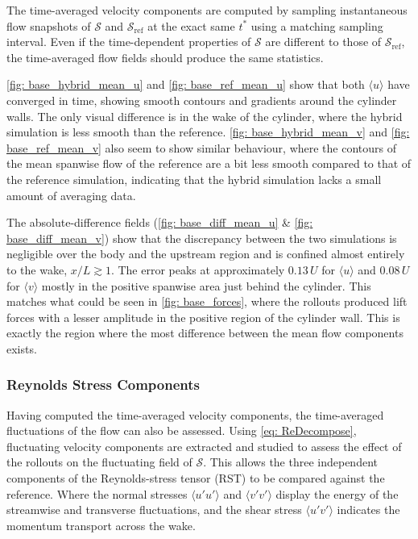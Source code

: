 The time-averaged velocity components are computed by sampling instantaneous flow snapshots of $\mathcal{S}$ and $\mathcal{S}_\text{ref}$ at the exact same $t^*$ using a matching sampling interval. Even if the time-dependent properties of $\mathcal{S}$ are different to those of $\mathcal{S}_\text{ref}$, the time-averaged flow fields should produce the same statistics. 

\autoref{fig: base_hybrid_mean_u} and \autoref{fig: base_ref_mean_u} show that both $\langle u\rangle$ have converged in time, showing smooth contours and gradients around the cylinder walls. The only visual difference is in the wake of the cylinder, where the hybrid simulation is less smooth than the reference. \autoref{fig: base_hybrid_mean_v} and \autoref{fig: base_ref_mean_v} also seem to show similar behaviour, where the contours of the mean spanwise flow of the reference are a bit less smooth compared to that of the reference simulation, indicating that the hybrid simulation lacks a small amount of averaging data. 

The absolute-difference fields (\autoref{fig: base_diff_mean_u} \& \autoref{fig: base_diff_mean_v}) show that the discrepancy between the two simulations is negligible over the body and the upstream region and is confined almost entirely to the wake, $x/L \gtrsim 1$. The error peaks at approximately $0.13\,U$ for $\langle u\rangle$ and $0.08\,U$ for $\langle v\rangle$ mostly in the positive spanwise area just behind the cylinder. This matches what could be seen in \autoref{fig: base_forces}, where the rollouts produced lift forces with a lesser amplitude in the positive region of the cylinder wall. This is exactly the region where the most difference between the mean flow components exists. 


\subsubsection{Reynolds Stress Components}

Having computed the time-averaged velocity components, the time-averaged fluctuations of the flow can also be assessed. Using \autoref{eq: ReDecompose}, fluctuating velocity components are extracted and studied to assess the effect of the rollouts on the fluctuating field of $\mathcal{S}$. This allows the three independent components of the Reynolds-stress tensor (RST) to be compared against the reference. Where the normal stresses $\langle u'u'\rangle$ and $\langle v'v'\rangle$ display the energy of the streamwise and transverse fluctuations, and the shear stress $\langle u'v'\rangle$ indicates the momentum transport across the wake.


